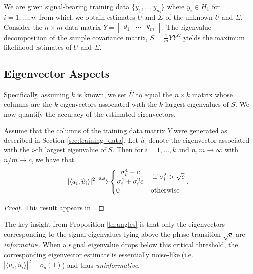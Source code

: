 We are given signal-bearing training data $\{y_1,\dots,y_m\}$ where $y_i\in H_1$ for $i=1,\dots,m$ from which we obtain estimates $\widehat{U}$ and $\widehat{\Sigma}$ of the unknown $U$ and $\Sigma$. Consider the $n \times m$ data matrix $Y = \begin{bmatrix} y_1 & \ldots & y_m \end{bmatrix}$. The eigenvalue decomposition of the sample covariance matrix, $S=\frac{1}{m}YY^H$ yields the maximum likelihood estimates of $U$ and $\Sigma$.


\subsection{Eigenvector Aspects}

Specifically, assuming $k$ is known, we set $\widehat{U}$ to equal the $n \times k$ matrix whose columns are the $k$ eigenvectors associated with the $k$ largest eigenvalues of $S$. We now quantify the accuracy of the estimated eigenvectors.\\

\begin{prop}\label{th:angles}
Assume that the columns of the training data matrix $Y$ were generated as described in Section \ref{sec:training_data}. Let $\widehat{u}_{i}$ denote the eigenvector associated with the $i$-th largest eigenvalue of $S$. Then for $i = 1, \ldots, k$ and $n, m \longrightarrow \infty$ with $n/m \to c$, we have that
\begin{equation}
|\langle u_i,\widehat{u}_i\rangle|^2 \overset{\textrm{a.s.}}{\longrightarrow}
\begin{cases}
\dfrac{\sigma_i^4-c}{\sigma_{i}^4+\sigma_{i}^2c} & \text{ if } \sigma_{i}^2>\sqrt{c}\\
0 & \textrm{otherwise}\\
\end{cases}.
\end{equation}
\end{prop}
\begin{proof}
This result appears in \cite{paul2007asymptotics,benaych2011eigenvalues}.
\end{proof}


The key insight from Proposition \ref{th:angles} is that only the eigenvectors corresponding to the signal eigenvalues lying above the phase transition $\sqrt{c}$ are \textit{informative}. When a signal eigenvalue drops below this critical threshold, the corresponding eigenvector estimate is essentially noise-like  (i.e. $|\langle u_i,\widehat{u}_i\rangle|^2=o_{p}(1)$) and thus \textit{uninformative}.

